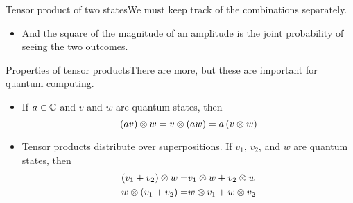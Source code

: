 \begin{frame}{Tensor product of two states}{We must keep track of the combinations separately.}
{{\begin{itemize}
    \item And the square of the magnitude of an amplitude is the joint probability of seeing the two outcomes.
\end{itemize}
}
}{%
}
\end{frame}

\begin{frame}{Properties of tensor products}{There are more, but these are important for quantum computing.}
\begin{itemize}
    \item If $a \in \mathbb{C}$ and $v$ and $w$ are quantum states, then
    \[ 
       (av)\otimes w = v\otimes (aw) = a\,(v\otimes w)
    \]
    \item Tensor products distribute over superpositions.  If $v_{1}$, $v_{2}$, and $w$ are quantum states, then
    \begin{align*}
       (v_{1}+v_{2})\otimes w = & v_{1}\otimes w + v_{2}\otimes w \\
       w\otimes (v_{1}+v_{2}) = & w\otimes v_{1} + w\otimes v_{2}
    \end{align*}
\end{itemize}
\end{frame}

